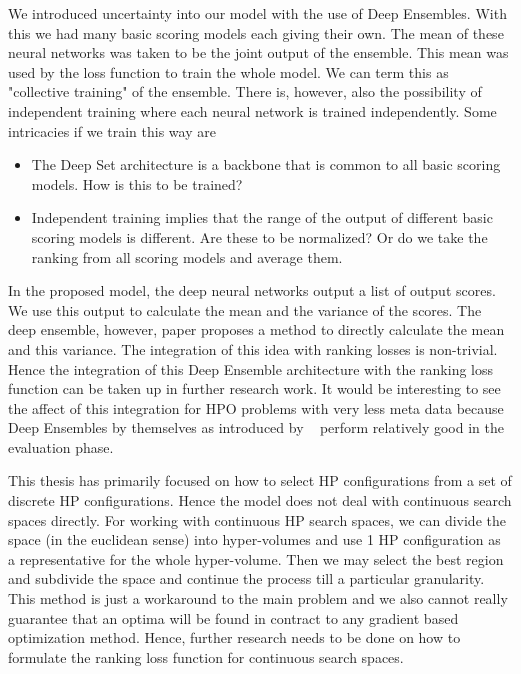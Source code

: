 \documentclass[12pt, twoside, ngerman]{report}
\begin{document}
We introduced uncertainty into our model with the use of Deep Ensembles. 
With this we had many basic scoring models each giving their own.
The mean of these neural networks was taken to be the joint output of the
ensemble.
This mean was used by the loss function to train the whole model.
We can term this as "collective training" of the ensemble.
There is,  however,  also the possibility of independent training where each neural network is trained independently.
Some intricacies if we train this way are
\begin{itemize}
\item The Deep Set architecture is a backbone that is common to all basic scoring models.  How is this to be trained?
\item Independent training implies that the range of the output of different basic scoring models is different. 
Are these to be normalized? Or do we take the ranking from all scoring models and average them.
\end{itemize}

In the proposed model,  the deep neural networks output a list of output scores. 
We use this output to calculate the mean and the variance of the scores.
The deep ensemble, however, paper proposes a method to directly calculate the mean and this variance.
The integration of this idea with ranking losses is non-trivial.
Hence the integration of this Deep Ensemble architecture with the ranking loss function can be taken up in further research work.
It would be interesting to see the affect of this integration for HPO problems with very less meta data because Deep Ensembles by themselves as introduced by ~\cite{DeepEnsemblePaper} perform relatively good in the evaluation phase.

This thesis has primarily focused on how to select HP configurations from a set of discrete HP configurations.
Hence the model does not deal with continuous search spaces directly.
For working with continuous HP search spaces,  we can divide the space  (in the euclidean sense) into hyper-volumes and use 1 HP configuration as a representative for the whole hyper-volume.
Then we may select the best region and subdivide the space and continue the process till a particular granularity.
This method is just a workaround to the main problem and we also cannot really guarantee that an optima will be found in contract to any gradient based optimization method.
Hence,  further research needs to be done on how to formulate the ranking loss function for continuous search spaces.
\end{document}
